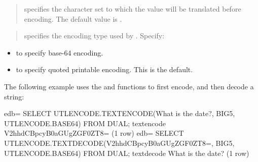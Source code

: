 \documentclass[letterpaper,10pt,english,openany,oneside]{sphinxmanual}
\begin{document}
\begin{quote}

 specifies the character set to which the value
will be translated before encoding. The default value is .
\end{quote}

\begin{quote}

 specifies the encoding type used by .
Specify:
\end{quote}
\begin{itemize}
\item {} 
 to specify base-64 encoding.

\item {} 
 to specify quoted printable encoding.
This is the default.

\end{itemize}


The following example uses the  and  functions
to first encode, and then decode a string:

%
\begin{sphinxVerbatim}[commandchars=\\\{\}]
edb=\PYGZsh{} SELECT UTL\PYGZus{}ENCODE.TEXT\PYGZus{}ENCODE(\PYGZsq{}What is the date?\PYGZsq{}, \PYGZsq{}BIG5\PYGZsq{},
UTL\PYGZus{}ENCODE.BASE64) FROM DUAL;
text\PYGZus{}encode
\PYGZhy{}\PYGZhy{}\PYGZhy{}\PYGZhy{}\PYGZhy{}\PYGZhy{}\PYGZhy{}\PYGZhy{}\PYGZhy{}\PYGZhy{}\PYGZhy{}\PYGZhy{}\PYGZhy{}\PYGZhy{}\PYGZhy{}\PYGZhy{}\PYGZhy{}\PYGZhy{}\PYGZhy{}\PYGZhy{}\PYGZhy{}\PYGZhy{}\PYGZhy{}\PYGZhy{}\PYGZhy{}\PYGZhy{}
V2hhdCBpcyB0aGUgZGF0ZT8=
(1 row)
edb=\PYGZsh{} SELECT UTL\PYGZus{}ENCODE.TEXT\PYGZus{}DECODE(\PYGZsq{}V2hhdCBpcyB0aGUgZGF0ZT8=\PYGZsq{}, \PYGZsq{}BIG5\PYGZsq{},
UTL\PYGZus{}ENCODE.BASE64) FROM DUAL;
text\PYGZus{}decode
\PYGZhy{}\PYGZhy{}\PYGZhy{}\PYGZhy{}\PYGZhy{}\PYGZhy{}\PYGZhy{}\PYGZhy{}\PYGZhy{}\PYGZhy{}\PYGZhy{}\PYGZhy{}\PYGZhy{}\PYGZhy{}\PYGZhy{}\PYGZhy{}\PYGZhy{}\PYGZhy{}\PYGZhy{}
What is the date?
(1 row)
\end{sphinxVerbatim}

\newpage
\end{document}
